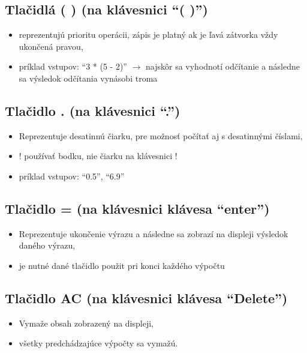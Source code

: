 \documentclass[a4paper, 11pt]{article}
\begin{document}
        \subsection{Tlačidlá ( ) (na klávesnici “( )”)}
        \begin{itemize}
            \item reprezentujú prioritu operácii, zápis je platný ak je ľavá zátvorka vždy ukončená pravou,
            \item príklad vstupov: “3 * (5 - 2)”  $\rightarrow$ najskôr sa vyhodnotí odčítanie a
            následne sa výsledok odčítania vynásobi troma
        \end{itemize}
        
    	\subsection{Tlačidlo . (na klávesnici “.”)}
        \begin{itemize}
            \item Reprezentuje desatinnú čiarku, pre možnosť počítať aj s desatinnými číslami,
            \item ! používať bodku, nie čiarku na klávesnici !
            \item príklad vstupov:  “0.5”, “6.9”
        \end{itemize}
        
        \subsection{Tlačidlo = (na klávesnici klávesa “enter”)}
        \begin{itemize}
            \item Reprezentuje ukončenie výrazu a následne sa zobrazí na displeji výsledok daného výrazu,
            \item je nutné dané tlačidlo použit pri konci každého výpočtu
        \end{itemize}
        
        \subsection{Tlačidlo AC (na klávesnici klávesa “Delete”)}
        \begin{itemize}
            \item Vymaže obsah zobrazený na displeji,
            \item všetky predchádzajúce výpočty sa vymažú.
        \end{itemize}
        
\end{document}
